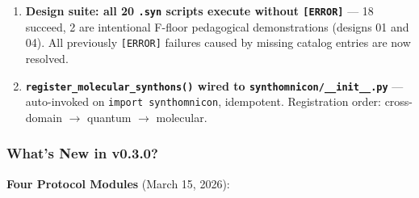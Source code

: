 \documentclass[12pt,a4paper]{article}
\begin{document}
\begin{enumerate}
    \item \textbf{Design suite: all 20 \texttt{.syn} scripts execute without \texttt{{[}ERROR{]}}} --- 18 succeed, 2 are intentional F-floor pedagogical demonstrations (designs 01 and 04). All previously \texttt{{[}ERROR{]}} failures caused by missing catalog entries are now resolved.
    \item \textbf{\texttt{register\_molecular\_synthons()} wired to \texttt{synthomnicon/\_\_init\_\_.py}} --- auto-invoked on \texttt{import synthomnicon}, idempotent. Registration order: cross-domain $\rightarrow$ quantum $\rightarrow$ molecular.
\end{enumerate}

\subsubsection{What's New in v0.3.0?}

\textbf{Four Protocol Modules} (March 15, 2026):
\end{document}
